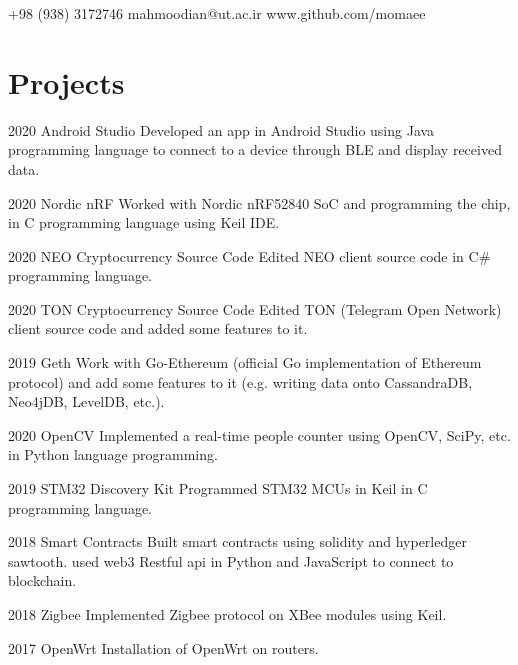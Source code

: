 \documentclass{tccv}
\begin{document}
	{+98 (938) 3172746}
	{mahmoodian@ut.ac.ir}
	{www.github.com/momaee}
	
	\section{Projects}
	
	\begin{yearlist}
		
		\item{2020}
		{Android Studio}
		{Developed an app in Android Studio using Java programming language to connect to a device through BLE and display received data.}
		
		\item{2020}
		{Nordic nRF}
		{Worked with Nordic nRF52840 SoC and programming the chip, in C programming language using Keil IDE.}
		
		\item{2020}
		{NEO Cryptocurrency Source Code}
		{Edited NEO client source code in C\# programming language.}
		
		\item{2020}
		{TON Cryptocurrency Source Code}
		{Edited TON (Telegram Open Network) client source code and added some features to it.}
		
		\item{2019}
		{Geth}
		{Work with Go-Ethereum (official Go implementation of Ethereum protocol) and add some features to it (e.g. writing data onto CassandraDB, Neo4jDB, LevelDB, etc.).}
		
		\item{2020}
		{OpenCV}
		{Implemented a real-time people counter using OpenCV, SciPy, etc. in Python language programming.}
		
		\item{2019}
		{STM32 Discovery Kit}
		{Programmed STM32 MCUs in Keil in C programming language.}
		
		\item{2018}
		{Smart Contracts}
		{Built smart contracts using solidity and hyperledger sawtooth. used web3 Restful api in Python and JavaScript to connect to blockchain.}
		
		\item{2018}
		{Zigbee}
		{Implemented Zigbee protocol on XBee modules using Keil.}
		
		\item{2017}
		{OpenWrt}
		{Installation of OpenWrt on routers.}
	\end{yearlist}
	
\end{document}
